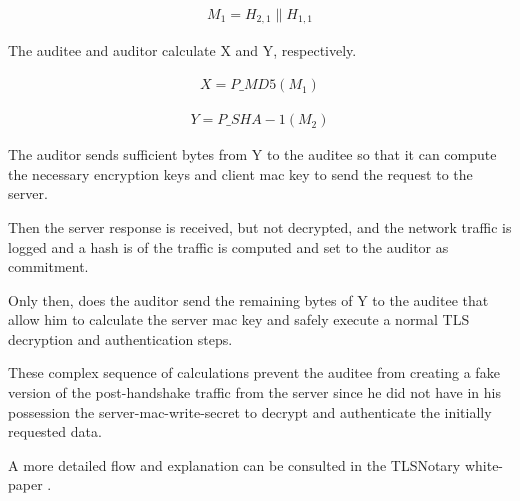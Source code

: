 \begin{ceqn}
    \begin{align}
        M_{1} = H_{2,1} \parallel H_{1,1}
    \end{align}
\end{ceqn}

The auditee and auditor calculate X and Y, respectively.

\begin{ceqn}
    \begin{align}
        X = P\_MD5(M_{1})
    \end{align}
\end{ceqn}

\begin{ceqn}
    \begin{align}
        Y = P\_SHA-1(M_{2})
    \end{align}
\end{ceqn}

The auditor sends sufficient bytes from Y to the auditee so that it can compute the necessary encryption keys and client mac key to send the request to the server.

Then the server response is received, but not decrypted, and the network traffic is logged and a hash is of the traffic is computed and set to the auditor as commitment.

Only then, does the auditor send the remaining bytes of Y to the auditee that allow him to calculate the server mac key and safely execute a normal TLS decryption and authentication steps.

These complex sequence of calculations prevent the auditee from creating a fake version of the post-handshake traffic from the server since he did not have in his possession the server-mac-write-secret to decrypt and authenticate the initially requested data.

A more detailed flow and explanation can be consulted in the TLSNotary white-paper \cite{2014TLSnotary-aSessions}.



